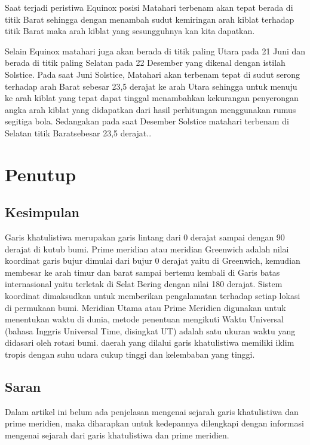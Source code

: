 	Saat terjadi peristiwa Equinox posisi Matahari terbenam akan tepat berada di titik Barat sehingga dengan menambah sudut kemiringan arah kiblat 
terhadap titik Barat maka arah kiblat yang sesungguhnya kan kita dapatkan. 

	Selain Equinox matahari juga akan berada di titik paling Utara pada 21 Juni dan berada di titik paling Selatan pada 22 Desember yang dikenal dengan 
istilah Solstice. Pada saat Juni Solstice, Matahari akan terbenam tepat di sudut serong terhadap arah Barat sebesar 23,5 derajat ke arah Utara
sehingga untuk menuju ke arah kiblat yang tepat dapat tinggal menambahkan kekurangan penyerongan angka arah kiblat yang didapatkan dari hasil perhitungan 
menggunakan rumus segitiga bola. Sedangakan pada saat Desember Solstice matahari terbenam di Selatan titik Baratsebesar 23,5 derajat.\cite {arkanudin2008teknik}.

\section {Penutup}

\subsection{Kesimpulan}
	
	Garis khatulistiwa merupakan garis lintang dari 0 derajat sampai dengan 90 derajat di kutub bumi. Prime meridian atau meridian Greenwich adalah 
nilai koordinat garis bujur dimulai dari bujur 0 derajat yaitu di Greenwich, kemudian membesar ke arah timur dan barat sampai bertemu kembali di Garis batas 
internasional yaitu terletak di Selat Bering dengan nilai 180 derajat. Sistem koordinat dimaksudkan untuk memberikan pengalamatan terhadap setiap lokasi 
di permukaan bumi. Meridian Utama atau Prime Meridien digunakan untuk menentukan waktu di dunia, metode penentuan mengikuti Waktu Universal (bahasa 
Inggris Universal Time, disingkat UT) adalah satu ukuran waktu yang didasari oleh rotasi bumi. daerah yang dilalui garis khatulistiwa memiliki iklim tropis 
dengan suhu udara cukup tinggi dan kelembaban yang tinggi.

\subsection{Saran}

	Dalam artikel ini belum ada penjelasan mengenai sejarah garis khatulistiwa dan prime meridien, maka diharapkan untuk  kedepannya dilengkapi dengan 
informasi mengenai sejarah dari garis khatulistiwa dan prime meridien.	